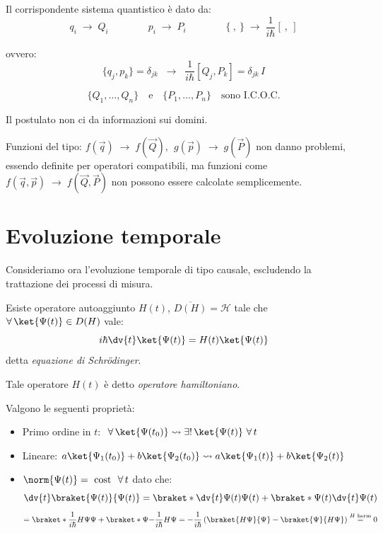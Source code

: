 \begin{postulato6}
    Il corrispondente sistema quantistico è dato da:
\[
q_i \;\longrightarrow\; Q_i
\qquad\qquad
p_i \;\longrightarrow\; P_i
\qquad\qquad
\{\ , \ \} \;\longrightarrow\; \frac{1}{i\hbar}[\  , \ ]
\]

ovvero:
\[
\{ q_j, p_k \} = \delta_{jk}
\;\;\longrightarrow\;\;
\frac{1}{i\hbar}[Q_j, P_k] = \delta_{jk}\,I
\]

\[
\{ Q_1, \dots, Q_n \} \quad\text{e}\quad \{ P_1, \dots, P_n \}
\quad\text{sono I.C.O.C.}
\]
\end{postulato6}

\begin{remark}
    Il postulato non ci da informazioni sui domini.
\end{remark}

\begin{remark}
    Funzioni del tipo: \(f(\vec{q}) \;\longrightarrow\; f(\vec{Q}), \ \ g(\vec{p}) \;\longrightarrow\; g(\vec{P})\) 
    non danno problemi, essendo definite per operatori compatibili, ma funzioni come\(f(\vec{q},\vec{p}) \;\longrightarrow\; f(\vec{Q}, \vec{P})\) non possono essere calcolate semplicemente.
\end{remark}



\section{Evoluzione temporale}
Consideriamo ora l'evoluzione temporale di tipo causale, escludendo la trattazione dei processi di misura.

\begin{postulato7}
    Esiste operatore autoaggiunto \(H(t)\), \(\overline{D(H)}= \mathcal{H}\) tale che \(\forall\, \ket{\Psi(t)}\in D(H)\) vale:
    \begin{equation}
        i\hbar \dv{t}\ket{\Psi(t)}= H(t)\ket{\Psi(t)}
    \end{equation}
    detta \textit{equazione di Schrödinger}.
\end{postulato7}

\begin{definition}
    Tale operatore \(H(t )\) è detto \textit{operatore hamiltoniano}.
\end{definition}

Valgono le seguenti proprietà:
\begin{itemize}
    \item Primo ordine in \(t\): \(\ \forall\, \ket{\Psi(t_0)} \rightsquigarrow \exists! \,\ket{\Psi(t)} \ \forall\, t\) 
    \item Lineare: \(a\ket{\Psi_1(t_0)}+b\ket{\Psi_2(t_0)}\rightsquigarrow a\ket{\Psi_1(t)}+b\ket{\Psi_2(t)}\)
    \item \(\norm{\Psi(t)}= \text{ cost } \ \forall \,t\) dato che:
    \[
        \dv{t}\braket{\Psi(t)}{\Psi(t)} =
        \braket*{\dv{t}\Psi(t)}{\Psi(t)} + \braket*{\Psi(t)}{\dv{t}\Psi(t)}
    \]
    \[
        = \braket*{\frac{1}{i\hbar}H\Psi}{\Psi} + \braket*{\Psi}{-\frac{1}{i\hbar}H\Psi}
        = -\frac{1}{i\hbar}\left( \braket{H\Psi}{\Psi} - \braket{\Psi}{H\Psi} \right)
        \overset{H \text{ herm}}{=} 0
    \]
\end{itemize}

